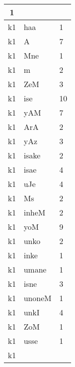 \documentclass[a4 paper]{article}
\begin{document}
\begin{longtable}{cp{}p{}}
1\\ \midrule k1 & haa & 1\\ \midrule k1 & A & 7\\ \midrule k1 & Mne & 1\\ \midrule k1 & m & 2\\ \midrule k1 & ZeM & 3\\ \midrule k1 & ise & 10\\ \midrule k1 & yAM & 7\\ \midrule k1 & ArA & 2\\ \midrule k1 & yAz & 3\\ \midrule k1 & isake & 2\\ \midrule k1 & isae & 4\\ \midrule k1 & uJe & 4\\ \midrule k1 & Ms & 2\\ \midrule k1 & inheM & 2\\ \midrule k1 & yoM & 9\\ \midrule k1 & unko & 2\\ \midrule k1 & inke & 1\\ \midrule k1 & umane & 1\\ \midrule k1 & isne & 3\\ \midrule k1 & unoneM & 1\\ \midrule k1 & unkI & 4\\ \midrule k1 & ZoM & 1\\ \midrule k1 & usse & 1\\ \midrule k1 & 
\end{longtable}
\end{document}
